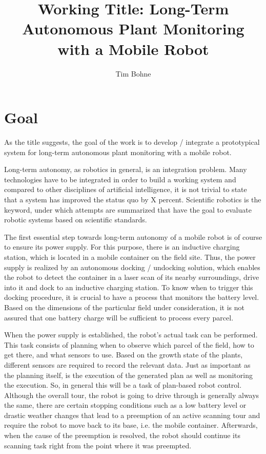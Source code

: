 \documentclass[german, master, expose, latin1]{base/thesis_KBS}
\begin{document}
\title{Working Title: Long-Term Autonomous Plant Monitoring with a Mobile Robot}
\author{Tim Bohne}

\generatetitle

\section{Goal}

As the title suggests, the goal of the work is to develop / integrate a prototypical system for long-term autonomous plant monitoring with a mobile robot.\newline

Long-term autonomy, as robotics in general, is an integration problem. Many technologies have to be integrated in order to build a working system and compared to
other disciplines of artificial intelligence, it is not trivial to state that a system has improved the status quo by X percent. Scientific robotics is the keyword,
under which attempts are summarized that have the goal to evaluate robotic systems based on scientific standards.\newline

The first essential step towards long-term autonomy of a mobile robot is of course to ensure its power supply.
For this purpose, there is an inductive charging station, which is located in a mobile container on the field site.
Thus, the power supply is realized by an autonomous docking / undocking solution, which enables the robot to detect the container in a laser scan
of its nearby surroundings, drive into it and dock to an inductive charging station. To know when to trigger this docking procedure, it is crucial 
to have a process that monitors the battery level. Based on the dimensions of the particular field under consideration, it is not assured that one battery 
charge will be sufficient to process every parcel.\newline

When the power supply is established, the robot's actual task can be performed. This task consists of planning when to observe which parcel of the field,
how to get there, and what sensors to use. Based on the growth state of the plants, different sensors are required to record the relevant data.
Just as important as the planning itself, is the execution of the generated plan as well as monitoring the execution.
So, in general this will be a task of plan-based robot control.
Although the overall tour, the robot is going to drive through is generally always the same, there are certain stopping conditions 
such as a low battery level or drastic weather changes that lead to a preemption of an active scanning tour and require the robot 
to move back to its base, i.e. the mobile container. Afterwards, when the cause of the preemption is resolved, 
the robot should continue its scanning task right from the point where it was preempted.\newline
\end{document}
